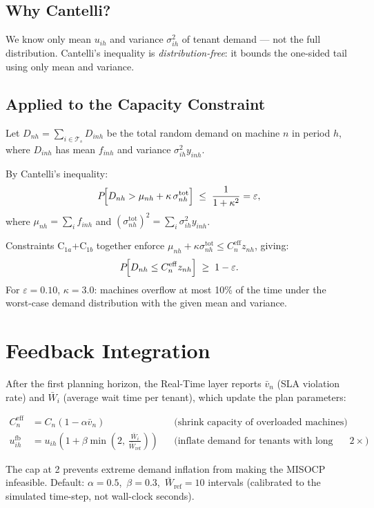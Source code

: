 \documentclass[11pt,a4paper]{article}
\newcommand{\Ts}{\mathcal{T}_s}
\newcommand{\Ceff}{C^{\mathrm{eff}}}
\newcommand{\ufb}{u^{\mathrm{fb}}}
\begin{document}
\subsection*{Why Cantelli?}
We know only mean $u_{ih}$ and variance $\sigma^2_{ih}$ of tenant demand — not the full distribution.
Cantelli's inequality is \emph{distribution-free}: it bounds the one-sided tail using only
mean and variance.

\subsection*{Applied to the Capacity Constraint}
Let $D_{nh}=\sum_{i\in\Ts}D_{inh}$ be the total random demand on machine $n$ in period $h$, where $D_{inh}$ has mean $f_{inh}$ and variance $\sigma^2_{ih}y_{inh}$.

By Cantelli's inequality:
\[
  P\!\Bigl[D_{nh} > \mu_{nh} + \kappa\,\sigma^{\mathrm{tot}}_{nh}\Bigr]
  \;\leq\; \frac{1}{1+\kappa^2} = \varepsilon,
\]
where $\mu_{nh}=\sum_i f_{inh}$ and $\left(\sigma^{\mathrm{tot}}_{nh}\right)^2=\sum_i\sigma^2_{ih}y_{inh}$.

Constraints C$_{1a}$+C$_{1b}$ together enforce $\mu_{nh}+\kappa\sigma^{\mathrm{tot}}_{nh}\leq\Ceff_n z_{nh}$, giving:
\[
  P\!\Bigl[D_{nh}\leq \Ceff_n z_{nh}\Bigr] \;\geq\; 1-\varepsilon.
\]
For $\varepsilon=0.10$, $\kappa=3.0$: machines overflow at most 10\% of the time
under the worst-case demand distribution with the given mean and variance.

\section{Feedback Integration}

After the first planning horizon, the Real-Time layer reports $\bar{v}_n$ (SLA violation rate)
and $\bar{W}_i$ (average wait time per tenant), which update the plan parameters:

\begin{align}
  \Ceff_n &= C_n(1-\alpha\bar{v}_n)
    & &\text{(shrink capacity of overloaded machines)} \\[4pt]
  \ufb_{ih} &= u_{ih}\!\left(1+\beta\min\!\left(2,\,\frac{\bar{W}_i}{\bar{W}_{\mathrm{ref}}}\right)\right)
    & &\text{(inflate demand for tenants with long waits, capped at }2\times\text{)}
\end{align}

The cap at 2 prevents extreme demand inflation from making the MISOCP infeasible.
Default: $\alpha=0.5$,\ $\beta=0.3$,\ $\bar{W}_{\mathrm{ref}}=10$ intervals
(calibrated to the simulated time-step, not wall-clock seconds).
\end{document}
